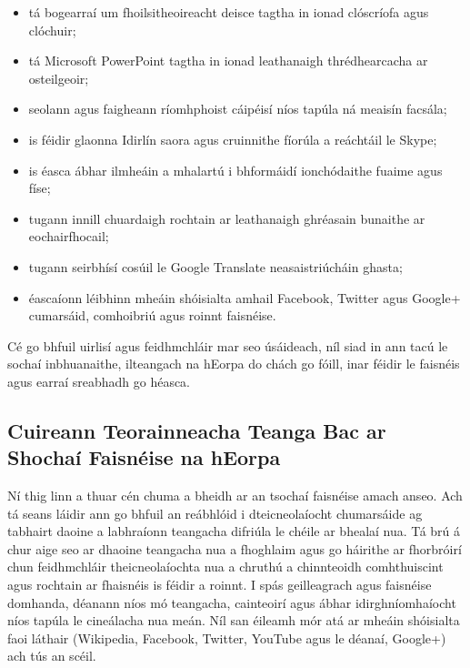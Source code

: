 \begin{multicols}{2}
\begin{itemize}
\item tá bogearraí um fhoilsitheoireacht deisce tagtha in ionad clóscríofa agus clóchuir;
\item tá Microsoft PowerPoint tagtha in ionad leathanaigh thrédhearcacha ar osteilgeoir;
\item seolann agus faigheann ríomhphoist cáipéisí níos tapúla ná meaisín facsála;
\item is féidir glaonna Idirlín saora agus cruinnithe fíorúla a reáchtáil le Skype;
\item is éasca ábhar ilmheáin a mhalartú i bhformáidí ionchódaithe fuaime agus físe;
\item tugann innill chuardaigh rochtain ar leathanaigh ghréasain bunaithe ar eochairfhocail;
\item tugann seirbhísí cosúil le Google Translate neasaistriúcháin ghasta;
\item éascaíonn léibhinn mheáin shóisialta amhail Facebook, Twitter agus Google+ cumarsáid, comhoibriú agus roinnt faisnéise.
\end{itemize}

Cé go bhfuil uirlisí agus feidhmchláir mar seo úsáideach, níl siad in ann tacú le sochaí inbhuanaithe, ilteangach na hEorpa do chách go fóill, inar féidir le faisnéis agus earraí sreabhadh go héasca.

\subsection{Cuireann Teorainneacha Teanga Bac ar Shochaí Faisnéise na hEorpa}
  
Ní thig linn a thuar cén chuma a bheidh ar an tsochaí faisnéise amach anseo. Ach tá seans láidir ann go bhfuil an reábhlóid i dteicneolaíocht chumarsáide ag tabhairt daoine a labhraíonn teangacha difriúla le chéile ar bhealaí nua. Tá brú á chur aige seo ar dhaoine teangacha nua a fhoghlaim agus go háirithe ar fhorbróirí chun feidhmchláir theicneolaíochta nua a chruthú a chinnteoidh comhthuiscint agus rochtain ar fhaisnéis is féidir a roinnt. I spás geilleagrach agus faisnéise domhanda, déanann níos mó teangacha, cainteoirí agus ábhar idirghníomhaíocht níos tapúla le cineálacha nua meán. Níl san éileamh mór atá ar mheáin shóisialta faoi láthair (Wikipedia, Facebook, Twitter, YouTube agus le déanaí, Google+) ach tús an scéil.



\end{multicols}
